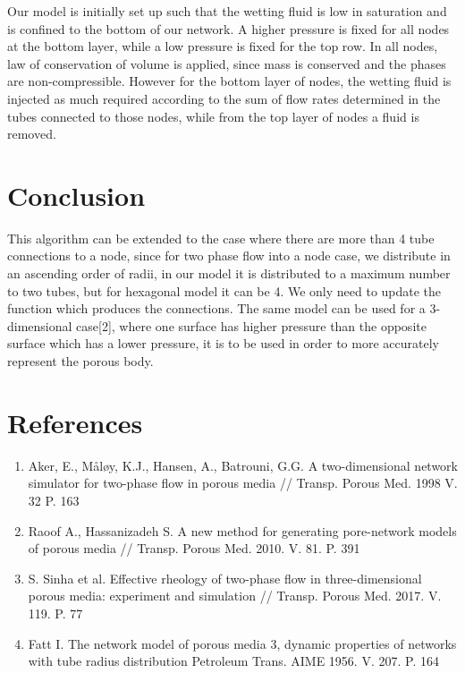 \documentclass[12pt]{article}
\begin{document}
	Our model is initially set up such that the wetting fluid is low in saturation and is confined to the bottom of our network. A higher pressure is fixed for all nodes at the bottom layer, while a  low pressure is fixed for the top row. In all nodes, law of conservation of volume is applied, since mass is conserved and the phases are non-compressible. However for the bottom layer of nodes, the wetting fluid is injected as much required according to the sum of flow rates determined in the tubes connected to those nodes, while from the top layer of nodes a fluid is removed.
	\section{Conclusion}
	This algorithm can be extended to the case where there are more than 4 tube connections to a node, since for two phase flow into a node case, we distribute in an ascending order of radii, in our model it is distributed to a maximum number to two tubes, but for hexagonal model it can be 4. We only need to update the function which produces the connections. The same model can be used for a 3-dimensional case[2], where one surface has higher pressure than the opposite surface which has a lower pressure, it is to be used in order to more accurately represent the porous body.


\section{References}
	\begin{enumerate}
		\item Aker, E., Måløy, K.J., Hansen, A., Batrouni, G.G. A two-dimensional network simulator for two-phase flow in porous media // Transp. Porous Med. 1998 V. 32 P. 163 
		\item Raoof A., Hassanizadeh S. A new method for generating pore-network models of porous media // Transp. Porous Med. 2010. V. 81. P. 391
		\item S. Sinha et al. Effective rheology of two-phase flow in three-dimensional porous media: experiment and simulation // Transp. Porous Med. 2017. V. 119. P. 77
		\item Fatt I. The network model of porous media 3, dynamic properties of networks with tube radius distribution Petroleum Trans. AIME 1956. V. 207. P. 164
	\end{enumerate}
\end{document}
